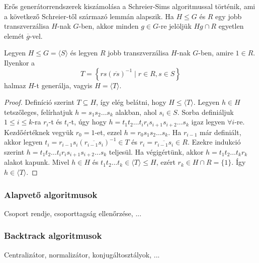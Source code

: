 Erős generátorrendszerek kiszámolása a Schreier-Sims algoritmussal történik, ami a következő Schreier-től származó lemmán alapszik.
Ha $H \le G$ és $R$ egy jobb transzverzálisa $H$-nak $G$-ben, akkor minden $g \in G$-re jelöljük
$Hg\cap R$ egyetlen elemét $\overline{g}$-vel.
\begin{lemma}
\label{thm:schreierlemma}
Legyen $H \le G = \langle S \rangle$ és legyen $R$ jobb transzverzálisa $H$-nak $G$-ben, amire $1\in R$.
Ilyenkor a
\begin{equation*}
T=\left\{ rs(\overline{rs})^{-1} \mid r\in R, s\in S \right\}
\end{equation*}
halmaz $H$-t generálja, vagyis $H=\langle T \rangle$.
\end{lemma}
\begin{proof}
Definíció szerint $T \subseteq H$, így elég belátni, hogy $H \le \langle T \rangle$.
Legyen $h \in H$ tetszőleges, felírhatjuk $h = s_1 s_2 \dots s_k$ alakban, ahol $s_i \in S$.
Sorba definiáljuk $1 \le i \le k$-ra $r_i$-t és $t_i$-t, úgy hogy $h = t_1 t_2 \dots t_i r_i s_{i+1} s_{i+2} \dots s_k$ igaz legyen $\forall i$-re.
Kezdőértéknek vegyük $r_0=1$-et, ezzel $h = r_0 s_1 s_2 \dots s_k$.
Ha $r_{i-1}$ már definiált, akkor legyen $t_i=r_{i-1} s_i (\overline{r_{i-1} s_i})^{-1} \in T$ és $r_i = \overline{r_{i-1} s_i} \in R$.
Ezekre indukció szerint $h = t_1 t_2 \dots t_i r_i s_{i+1} s_{i+2} \dots s_k$ teljesül.
Ha végigértünk, akkor $h = t_1 t_2 \dots t_k r_k$ alakot kapunk.
Mivel $h \in H$ és $t_1 t_2 \dots t_k \in \langle T \rangle \le H$, ezért $r_k \in H\cap R = \{1\}$.
Így $h \in \langle T \rangle$.
\end{proof}


\subsubsection{Alapvető algoritmusok}
\label{subsubsec:permbasic}
Csoport rendje, csoporttagság ellenőrzése, ...

\subsubsection{Backtrack algoritmusok}
\label{subsubsec:permbt}
Centralizátor, normalizátor, konjugáltosztályok, ...
